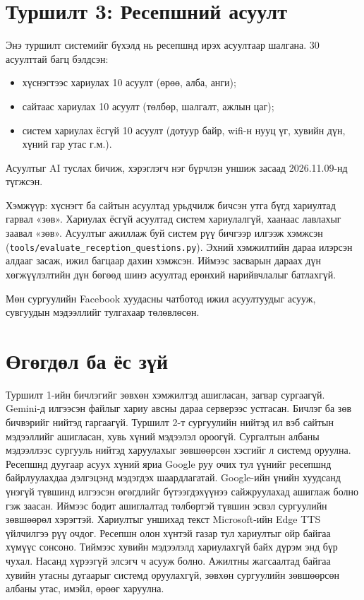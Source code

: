 \section{Туршилт 3: Ресепшний асуулт}
\label{sec:method-reception}

Энэ туршилт системийг бүхэлд нь ресепшнд ирэх асуултаар шалгана. 30 асуулттай багц бэлдсэн:
\begin{itemize}
    \item хүснэгтээс хариулах 10 асуулт (өрөө, алба, анги);
    \item сайтаас хариулах 10 асуулт (төлбөр, шалгалт, ажлын цаг);
    \item систем хариулах ёсгүй 10 асуулт (дотуур байр, wifi-н нууц үг, хувийн дүн, хүний гар утас г.м.).
\end{itemize}
Асуултыг AI туслах бичиж, хэрэглэгч нэг бүрчлэн уншиж засаад 2026.11.09-нд түгжсэн.

Хэмжүүр: хүснэгт ба сайтын асуултад урьдчилж бичсэн утга бүгд хариултад гарвал «зөв». Хариулах ёсгүй асуултад систем хариулалгүй, хаанаас лавлахыг заавал «зөв». Асуултыг ажиллаж буй систем рүү бичгээр илгээж хэмжсэн (\texttt{tools/\allowbreak evaluate\_reception\_questions.py}). Эхний хэмжилтийн дараа илэрсэн алдааг засаж, ижил багцаар дахин хэмжсэн. Иймээс засварын дараах дүн хөгжүүлэлтийн дүн бөгөөд шинэ асуултад ерөнхий нарийвчлалыг батлахгүй.

Мөн сургуулийн Facebook хуудасны чатботод ижил асуултуудыг асууж, сувгуудын мэдээллийг тулгахаар төлөвлөсөн.

\section{Өгөгдөл ба ёс зүй}
\label{sec:ethics}

Туршилт 1-ийн бичлэгийг зөвхөн хэмжилтэд ашигласан, загвар сургаагүй. Gemini-д илгээсэн файлыг хариу авсны дараа серверээс устгасан. Бичлэг ба зөв бичвэрийг нийтэд гаргаагүй. Туршилт 2-т сургуулийн нийтэд ил вэб сайтын мэдээллийг ашигласан, хувь хүний мэдээлэл ороогүй. Сургалтын албаны мэдээллээс сургууль нийтэд харуулахыг зөвшөөрсөн хэсгийг л системд оруулна. Ресепшнд дуугаар асуух хүний яриа Google руу очих тул үүнийг ресепшнд байрлуулахдаа дэлгэцэнд мэдэгдэх шаардлагатай. Google-ийн үнийн хуудсанд үнэгүй түвшинд илгээсэн өгөгдлийг бүтээгдэхүүнээ сайжруулахад ашиглаж болно гэж заасан. Иймээс бодит ашиглалтад төлбөртэй түвшин эсвэл сургуулийн зөвшөөрөл хэрэгтэй. Хариултыг уншихад текст Microsoft-ийн Edge TTS үйлчилгээ рүү очдог. Ресепшн олон хүнтэй газар тул хариултыг ойр байгаа хүмүүс сонсоно. Тиймээс хувийн мэдээлэлд хариулахгүй байх дүрэм энд бүр чухал. Насанд хүрээгүй элсэгч ч асууж болно. Ажилтны жагсаалтад байгаа хувийн утасны дугаарыг системд оруулахгүй, зөвхөн сургуулийн зөвшөөрсөн албаны утас, имэйл, өрөөг харуулна.
